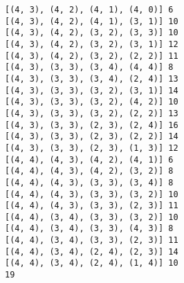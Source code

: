 \documentclass[11pt]{article}
\makeatletter
\newcommand{\boxspacing}{\kern\kvtcb@left@rule\kern\kvtcb@boxsep}
\newcommand{\prompt}[4]{
        {\ttfamily\llap{{\color{#2}[#3]:\hspace{3pt}#4}}\vspace{-\baselineskip}}
    }
\makeatother
\begin{document}
\begin{Verbatim}[commandchars=\\\{\}]
[(4, 3), (4, 2), (4, 1), (4, 0)] 6
[(4, 3), (4, 2), (4, 1), (3, 1)] 10
[(4, 3), (4, 2), (3, 2), (3, 3)] 10
[(4, 3), (4, 2), (3, 2), (3, 1)] 12
[(4, 3), (4, 2), (3, 2), (2, 2)] 11
[(4, 3), (3, 3), (3, 4), (4, 4)] 8
[(4, 3), (3, 3), (3, 4), (2, 4)] 13
[(4, 3), (3, 3), (3, 2), (3, 1)] 14
[(4, 3), (3, 3), (3, 2), (4, 2)] 10
[(4, 3), (3, 3), (3, 2), (2, 2)] 13
[(4, 3), (3, 3), (2, 3), (2, 4)] 16
[(4, 3), (3, 3), (2, 3), (2, 2)] 14
[(4, 3), (3, 3), (2, 3), (1, 3)] 12
[(4, 4), (4, 3), (4, 2), (4, 1)] 6
[(4, 4), (4, 3), (4, 2), (3, 2)] 8
[(4, 4), (4, 3), (3, 3), (3, 4)] 8
[(4, 4), (4, 3), (3, 3), (3, 2)] 10
[(4, 4), (4, 3), (3, 3), (2, 3)] 11
[(4, 4), (3, 4), (3, 3), (3, 2)] 10
[(4, 4), (3, 4), (3, 3), (4, 3)] 8
[(4, 4), (3, 4), (3, 3), (2, 3)] 11
[(4, 4), (3, 4), (2, 4), (2, 3)] 14
[(4, 4), (3, 4), (2, 4), (1, 4)] 10
19
    \end{Verbatim}

    \begin{tcolorbox}[breakable, size=fbox, boxrule=1pt, pad at break*=1mm,colback=cellbackground, colframe=cellborder]
\prompt{In}{incolor}{ }{\boxspacing}
\begin{Verbatim}[commandchars=\\\{\}]

\end{Verbatim}
\end{tcolorbox}
\end{document}
